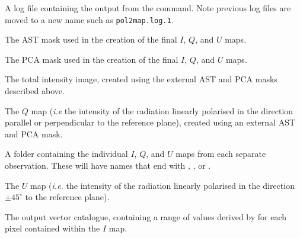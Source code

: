 \begin{aligndesc}
\item[\file{pol2map.log}] A log file containing the output from the
   command. Note previous log files are moved to a new name
  such as \texttt{pol2map.log.1}.

\item[\file{astmask.sdf}] The AST mask used in the creation
  of the final $I$, $Q$, and $U$ maps.

\item[\file{pcamask.sdf}] The PCA mask used in the creation of the
  final $I$, $Q$, and $U$ maps.

\item[\file{iext.sdf}] The total intensity image, created using the
  external AST and PCA masks described above.

\item[\file{qext.sdf}] The $Q$ map (\emph{i.e} the intensity of the radiation
  linearly polarised in the direction parallel or perpendicular to the
  reference plane), created using an external AST and PCA mask.

\item[\file{maps/}] A folder containing the individual $I$, $Q$, and $U$
  maps from each separate observation. These will have names that end with
  , , or .

\item[\file{uext.sdf}] The $U$ map (\emph{i.e.} the intensity of the radiation
  linearly polarised in the direction $\pm45^{\circ }$ to the reference plane).

\item[\file{mycat.FIT}] The output vector catalogue, containing a
  range of values derived by  for each pixel contained within
  the $I$ map.

\end{aligndesc}


